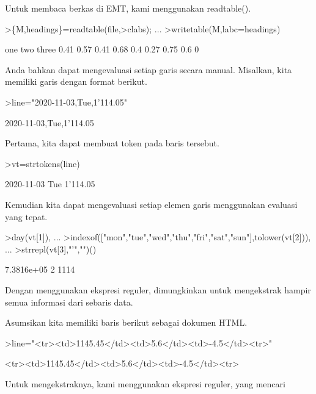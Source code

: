 \documentclass[a4paper,10pt]{article}
\begin{document}
\begin{eulernotebook}
\begin{eulercomment}
Untuk membaca berkas di EMT, kami menggunakan readtable().
\end{eulercomment}
\begin{eulerprompt}
>\{M,headings\}=readtable(file,>clabs); ...
>writetable(M,labc=headings)
\end{eulerprompt}
\begin{euleroutput}
         one       two     three
        0.41      0.57      0.41
        0.68       0.4      0.27
        0.75       0.6         0
\end{euleroutput}
\begin{eulercomment}
Anda bahkan dapat mengevaluasi setiap garis secara manual. Misalkan,
kita memiliki garis dengan format berikut.
\end{eulercomment}
\begin{eulerprompt}
>line="2020-11-03,Tue,1'114.05"
\end{eulerprompt}
\begin{euleroutput}
  2020-11-03,Tue,1'114.05
\end{euleroutput}
\begin{eulercomment}
Pertama, kita dapat membuat token pada baris tersebut.
\end{eulercomment}
\begin{eulerprompt}
>vt=strtokens(line)
\end{eulerprompt}
\begin{euleroutput}
  2020-11-03
  Tue
  1'114.05
\end{euleroutput}
\begin{eulercomment}
Kemudian kita dapat mengevaluasi setiap elemen garis menggunakan
evaluasi yang tepat.
\end{eulercomment}
\begin{eulerprompt}
>day(vt[1]),  ...
>indexof(["mon","tue","wed","thu","fri","sat","sun"],tolower(vt[2])),  ...
>strrepl(vt[3],"'","")()
\end{eulerprompt}
\begin{euleroutput}
  7.3816e+05
  2
  1114
\end{euleroutput}
\begin{eulercomment}
Dengan menggunakan ekspresi reguler, dimungkinkan untuk mengekstrak
hampir semua informasi dari sebaris data.

Asumsikan kita memiliki baris berikut sebagai dokumen HTML.
\end{eulercomment}
\begin{eulerprompt}
>line="<tr><td>1145.45</td><td>5.6</td><td>-4.5</td><tr>"
\end{eulerprompt}
\begin{euleroutput}
  <tr><td>1145.45</td><td>5.6</td><td>-4.5</td><tr>
\end{euleroutput}
\begin{eulercomment}
Untuk mengekstraknya, kami menggunakan ekspresi reguler, yang mencari


\end{eulercomment}
\end{eulernotebook}
\end{document}
